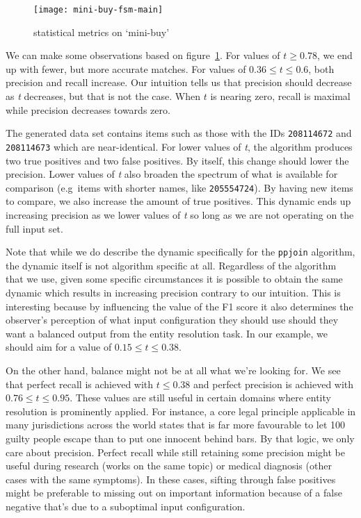 \begin{figure}[!hp]
    \centering
    \captionsetup{justification=centering}
    \texttt{[image: mini-buy-fsm-main]}
    \caption{statistical metrics on `mini-buy'}
    \label{fig:mini-buy-fs}
\end{figure}

We can make some observations based on figure~\ref{fig:mini-buy-fs}.
For values of $t \geq 0.78$, we end up with fewer, but more accurate matches.
For values of $0.36 \leq t \leq 0.6$, both precision and recall increase.
Our intuition tells us that precision should decrease as \textit{t} decreases,
but that is not the case.
When $t$ is nearing zero, recall is maximal while precision decreases towards
zero.

The generated data set contains items such as those with the IDs
\texttt{208114672} and \texttt{208114673} which are near-identical.
For lower values of \textit{t}, the algorithm produces two true positives and
two false positives.
By itself, this change should lower the precision.
Lower values of \textit{t} also broaden the spectrum of what is available for
comparison (e.g~items with shorter names, like \texttt{205554724}).
By having new items to compare, we also increase the amount of true positives.
This dynamic ends up increasing precision as we lower values of \textit{t} so
long as we are not operating on the full input set.

Note that while we do describe the dynamic specifically for the \texttt{ppjoin}
algorithm, the dynamic itself is not algorithm specific at all.
Regardless of the algorithm that we use, given some specific circumstances it is
possible to obtain the same dynamic which results in increasing precision
contrary to our intuition.
This is interesting because by influencing the value of the F1 score it also
determines the observer's perception of what input configuration they should use
should they want a balanced output from the entity resolution task.
In our example, we should aim for a value of $0.15\leq t \leq 0.38$.

On the other hand, balance might not be at all what we're looking for.
We see that perfect recall is achieved with $t \leq 0.38$ and perfect precision
is achieved with $0.76 \leq t \leq 0.95$.
These values are still useful in certain domains where entity resolution is
prominently applied.
For instance, a core legal principle applicable in many jurisdictions across the
world states that is far more favourable to let 100 guilty people escape than to
put one innocent behind bars.
By that logic, we only care about precision.
Perfect recall while still retaining some precision might be useful during
research (works on the same topic) or medical diagnosis (other cases with the same
symptoms).
In these cases, sifting through false positives might be preferable to missing
out on important information because of a false negative that's due to a
suboptimal input configuration.

